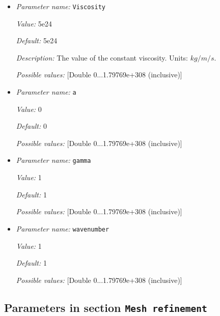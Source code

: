 \begin{itemize}
{\it Value:} 2e-5


{\it Default:} 2e-5


{\it Description:} The value of the thermal expansion coefficient $\beta$. Units: $1/K$.


{\it Possible values:} [Double 0...1.79769e+308 (inclusive)]
\item {\it Parameter name:} {\tt Viscosity}


{\it Value:} 5e24


{\it Default:} 5e24


{\it Description:} The value of the constant viscosity. Units: $kg/m/s$.


{\it Possible values:} [Double 0...1.79769e+308 (inclusive)]
\item {\it Parameter name:} {\tt a}


{\it Value:} 0


{\it Default:} 0


{\it Possible values:} [Double 0...1.79769e+308 (inclusive)]
\item {\it Parameter name:} {\tt gamma}


{\it Value:} 1


{\it Default:} 1


{\it Possible values:} [Double 0...1.79769e+308 (inclusive)]
\item {\it Parameter name:} {\tt wavenumber}


{\it Value:} 1


{\it Default:} 1


{\it Possible values:} [Double 0...1.79769e+308 (inclusive)]
\end{itemize}

\subsection{Parameters in section \tt Mesh refinement}
\label{parameters:Mesh_20refinement}

